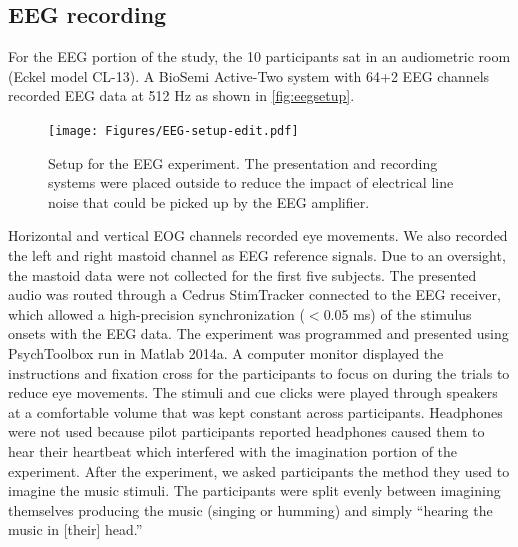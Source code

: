\subsection{EEG recording}
For the EEG portion of the study, the 10 participants sat in an audiometric room (Eckel model CL-13). 
A BioSemi Active-Two system with 64+2 EEG channels recorded EEG data at 512 Hz as shown in \autoref{fig:eegsetup}.
\begin{figure}[htb]
  \begin{center}
    \texttt{[image: Figures/EEG-setup-edit.pdf]}
    \caption{%
Setup for the EEG experiment.
The presentation and recording systems were placed outside to reduce the impact of electrical line noise that could be picked up by the EEG amplifier.
}
    \label{fig:eegsetup}
  \end{center}
\end{figure}
Horizontal and vertical EOG channels recorded eye movements. 
We also recorded the left and right mastoid channel as EEG reference signals. 
Due to an oversight, the mastoid data were not collected for the first five subjects.
The presented audio %
was routed through a Cedrus StimTracker connected to the EEG receiver, which allowed a high-precision synchronization ($<$0.05 ms) of the stimulus onsets with the \ac{EEG} data.
The experiment was programmed and presented using PsychToolbox run in Matlab 2014a. 
A computer monitor displayed the instructions and fixation cross for the participants to focus on during the trials to reduce eye movements.
The stimuli and cue clicks were played through speakers at a comfortable volume that was kept constant across participants. Headphones were not used because pilot participants reported headphones caused them to hear their heartbeat which interfered with the imagination portion of the experiment. 
After the experiment, we asked participants the method they used to imagine the music stimuli.
The participants were split evenly between imagining themselves producing the music (singing or humming) and simply ``hearing the music in [their] head.'' 

